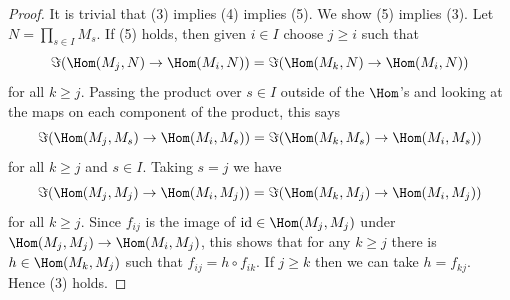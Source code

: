\begin{proof}
\medskip\noindent
It is trivial that (3) implies (4) implies (5).  We show (5) implies (3).  Let
$N = \prod_{s \in I} M_s$. If (5) holds, then given $i \in I$ choose $j \geq i$
such that
$$
\Im( \Hom(M_j, N) \to  \Hom(M_i, N)) =
\Im( \Hom(M_k, N) \to  \Hom(M_i, N))
$$
for all $k \geq j$.  Passing the product over $s \in I$ outside of the
$\Hom$'s
and looking at the maps on each component of the product, this says
$$
\Im( \Hom(M_j, M_s) \to  \Hom(M_i, M_s)) =
\Im( \Hom(M_k, M_s) \to   \Hom(M_i, M_s))
$$
for all $k \geq j$ and $s \in I$.  Taking $s = j$ we have
$$
\Im( \Hom(M_j, M_j) \to  \Hom(M_i, M_j)) =
\Im( \Hom(M_k, M_j) \to   \Hom(M_i, M_j))
$$
for all $k \geq j$.  Since $f_{ij}$ is the image of
$\text{id} \in  \Hom(M_j, M_j)$ under
$\Hom(M_j, M_j) \to  \Hom(M_i, M_j)$,
this shows  that for any $k \geq j$ there is $h \in \Hom(M_k, M_j)$
such that $f_{ij} = h \circ f_{ik}$.  If $j \geq k$ then we can take
$h = f_{kj}$. Hence (3) holds.
\end{proof}
